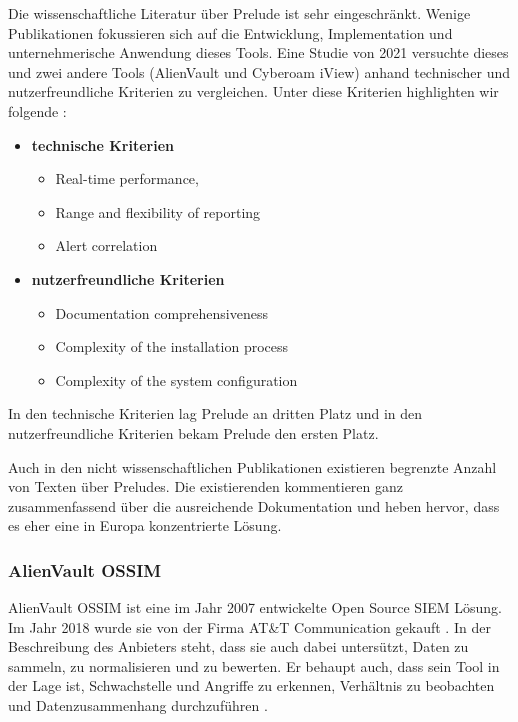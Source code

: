 Die wissenschaftliche Literatur über Prelude ist sehr eingeschränkt. Wenige Publikationen fokussieren sich auf die Entwicklung, Implementation und unternehmerische Anwendung dieses Tools. Eine Studie von 2021 versuchte dieses und zwei andere Tools (AlienVault und Cyberoam iView) anhand technischer und nutzerfreundliche Kriterien zu vergleichen. Unter diese Kriterien highlighten wir folgende \citep{Grammatikis_Prelude}:

\begin{itemize}[noitemsep]
   \item \textbf{technische Kriterien}
   \begin{itemize}[noitemsep]
      \item Real-time performance, 
      \item Range and flexibility of reporting
      \item Alert correlation
   \end{itemize}

   \item \textbf{nutzerfreundliche Kriterien}
   \begin{itemize}[noitemsep]
      \item Documentation comprehensiveness
      \item Complexity of the installation process
      \item Complexity of the system configuration
   \end{itemize}
\end{itemize}

In den technische Kriterien lag Prelude an dritten Platz und in den nutzerfreundliche Kriterien bekam Prelude den ersten Platz. 

Auch in den nicht wissenschaftlichen Publikationen existieren begrenzte Anzahl von Texten über Preludes. Die existierenden kommentieren ganz zusammenfassend über die ausreichende Dokumentation und heben hervor, dass es eher eine in Europa konzentrierte Lösung.

\subsubsection{AlienVault OSSIM}
AlienVault OSSIM ist eine im Jahr 2007 entwickelte \gls{Open Source} SIEM Lösung. Im Jahr 2018 wurde sie von der Firma AT\&T Communication gekauft \citep{CBN_AV}. In der Beschreibung des Anbieters steht, dass sie auch dabei untersützt, Daten zu sammeln, zu normalisieren und zu bewerten. Er behaupt auch, dass sein Tool in der Lage ist, Schwachstelle und Angriffe zu erkennen, Verhältnis zu beobachten und Datenzusammenhang durchzuführen \citep{ATT_AVO}.

